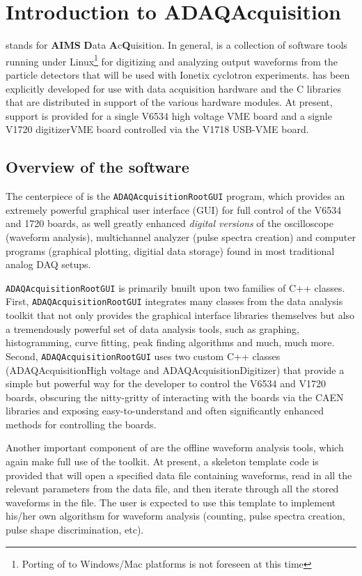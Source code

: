 \chapter{Introduction to ADAQAcquisition}
\label{chap:introdurction}

\ADAQ stands for \textbf{AIMS} \textbf{D}ata
\textbf{A}c\textbf{Q}uisition. In general, \ADAQ is a collection of
software tools running under Linux\footnote{Porting of \ADAQ to
  Windows/Mac platforms is not foreseen at this time} for digitizing
and analyzing output waveforms from the particle detectors that will
be used with Ionetix cyclotron experiments. \ADAQ has been explicitly
developed for use with \CAEN data acquisition hardware and the \CAEN C
libraries that are distributed in support of the various hardware
modules. At present, support is provided for a single \CAEN V6534 high
voltage VME board and a signle \CAEN V1720 digitizerVME board
controlled via the \CAEN V1718 USB-VME board.

\section{Overview of the \ADAQ software}
\label{sec: overviewsoftware}
The centerpiece of \ADAQ is the \texttt{ADAQAcquisitionRootGUI} program, which
provides an extremely powerful graphical user interface (GUI) for full
control of the V6534 and 1720 boards, as well greatly enhanced
\textit{digital versions} of the oscilloscope (waveform analysis),
multichannel analyzer (pulse spectra creation) and computer programs
(graphical plotting, digitial data storage) found in most traditional
analog DAQ setups.

\texttt{ADAQAcquisitionRootGUI} is primarily bnuilt upon two families of C++
classes. First, \texttt{ADAQAcquisitionRootGUI} integrates many classes from the
\ROOT data analysis toolkit that not only provides the graphical
interface libraries themselves but also a tremendously powerful set of
data analysis tools, such as graphing, histogramming, curve fitting,
peak finding algorithms and much, much more. Second,
\texttt{ADAQAcquisitionRootGUI} uses two custom C++ classes (ADAQAcquisitionHigh voltage
and ADAQAcquisitionDigitizer) that provide a simple but powerful way for the \ADAQ
developer to control the V6534 and V1720 boards, obscuring the
nitty-gritty of interacting with the boards via the CAEN libraries and
exposing easy-to-understand and often significantly enhanced methods
for controlling the boards.

Another important component of \ADAQ are the offline waveform analysis
tools, which again make full use of the \ROOT toolkit. At present, a
skeleton template code is provided that will open a specified data
file containing waveforms, read in all the relevant parameters from
the data file, and then iterate through all the stored waveforms in
the file. The user is expected to use this template to implement
his/her own algorithsm for waveform analysis (counting, pulse spectra
creation, pulse shape discrimination, etc).

